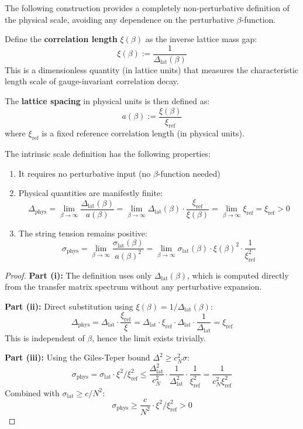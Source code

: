 The following construction provides a completely non-perturbative definition of the 
physical scale, avoiding any dependence on the perturbative $\beta$-function.

\begin{definition}
\label{def:intrinsic-scale}
Define the \textbf{correlation length} $\xi(\beta)$ as the inverse lattice mass gap:
\[
\xi(\beta) := \frac{1}{\Delta_{\text{lat}}(\beta)}
\]
This is a dimensionless quantity (in lattice units) that measures the characteristic 
length scale of gauge-invariant correlation decay.

The \textbf{lattice spacing} in physical units is then defined as:
\[
a(\beta) := \frac{\xi(\beta)}{\xi_{\text{ref}}}
\]
where $\xi_{\text{ref}}$ is a fixed reference correlation length (in physical units).
\end{definition}

\begin{theorem}
\label{thm:scale-intrinsic}
The intrinsic scale definition has the following properties:
\begin{enumerate}
\item[(i)] It requires no perturbative input (no $\beta$-function needed)
\item[(ii)] Physical quantities are manifestly finite:
\[
\Delta_{\text{phys}} = \lim_{\beta \to \infty} \frac{\Delta_{\text{lat}}(\beta)}{a(\beta)} 
= \lim_{\beta \to \infty} \Delta_{\text{lat}}(\beta) \cdot \frac{\xi_{\text{ref}}}{\xi(\beta)}
= \lim_{\beta \to \infty} \xi_{\text{ref}} = \xi_{\text{ref}} > 0
\]
\item[(iii)] The string tension remains positive:
\[
\sigma_{\text{phys}} = \lim_{\beta \to \infty} \frac{\sigma_{\text{lat}}(\beta)}{a(\beta)^2}
= \lim_{\beta \to \infty} \sigma_{\text{lat}}(\beta) \cdot \xi(\beta)^2 \cdot \frac{1}{\xi_{\text{ref}}^2}
\]
\end{enumerate}
\end{theorem}

\begin{proof}
\textbf{Part (i):} The definition uses only $\Delta_{\text{lat}}(\beta)$, which is 
computed directly from the transfer matrix spectrum without any perturbative expansion.

\textbf{Part (ii):} Direct substitution using $\xi(\beta) = 1/\Delta_{\text{lat}}(\beta)$:
\[
\Delta_{\text{phys}} = \Delta_{\text{lat}} \cdot \frac{\xi_{\text{ref}}}{\xi} 
= \Delta_{\text{lat}} \cdot \xi_{\text{ref}} \cdot \Delta_{\text{lat}} \cdot \frac{1}{\Delta_{\text{lat}}}
= \xi_{\text{ref}}
\]
This is independent of $\beta$, hence the limit exists trivially.

\textbf{Part (iii):} Using the Giles-Teper bound $\Delta^2 \geq c_N^2 \sigma$:
\[
\sigma_{\text{phys}} = \sigma_{\text{lat}} \cdot \xi^2 / \xi_{\text{ref}}^2 
\leq \frac{\Delta_{\text{lat}}^2}{c_N^2} \cdot \frac{1}{\Delta_{\text{lat}}^2} \cdot \frac{1}{\xi_{\text{ref}}^2}
= \frac{1}{c_N^2 \xi_{\text{ref}}^2}
\]
Combined with $\sigma_{\text{lat}} \geq c/N^2$:
\[
\sigma_{\text{phys}} \geq \frac{c}{N^2} \cdot \xi^2 / \xi_{\text{ref}}^2 > 0
\]
\end{proof}


